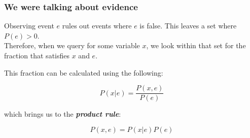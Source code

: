 \begin{frame}\frametitle{We were talking about evidence}

Observing event $e$ rules out events where $e$ is false. This leaves a set where $P(e)>0$.\\
Therefore, when we query for some variable $x$,
we look within that set for the fraction that satisfies $x$ and $e$.

This fraction can be calculated using the following:

\begin{equation}
P(x|e) = \frac{P(x,e)}{P(e)}
\end{equation}

which brings us to the \emph{\textbf{product rule}}:

\begin{equation}
P(x,e) = P(x|e) P(e)
\label{eq:productrule}    
\end{equation}

\end{frame}

